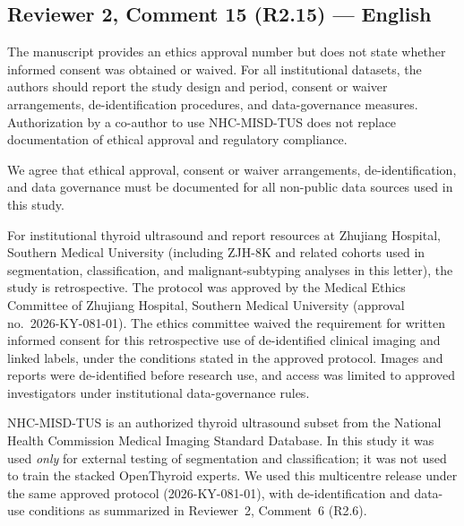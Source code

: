 \subsection*{Reviewer 2, Comment 15 (R2.15) --- English}
\begin{reviewercomment}
The manuscript provides an ethics approval number but does not state whether informed consent was obtained or waived. For all institutional datasets, the authors should report the study design and period, consent or waiver arrangements, de-identification procedures, and data-governance measures. Authorization by a co-author to use NHC-MISD-TUS does not replace documentation of ethical approval and regulatory compliance.
\end{reviewercomment}
\begin{authorresponse}
We agree that ethical approval, consent or waiver arrangements, de-identification, and data governance must be documented for all non-public data sources used in this study.\par
For institutional thyroid ultrasound and report resources at Zhujiang Hospital, Southern Medical University (including ZJH-8K and related cohorts used in segmentation, classification, and malignant-subtyping analyses in this letter), the study is retrospective. The protocol was approved by the Medical Ethics Committee of Zhujiang Hospital, Southern Medical University (approval no.\ 2026-KY-081-01). The ethics committee waived the requirement for written informed consent for this retrospective use of de-identified clinical imaging and linked labels, under the conditions stated in the approved protocol. Images and reports were de-identified before research use, and access was limited to approved investigators under institutional data-governance rules.\par
NHC-MISD-TUS is an authorized thyroid ultrasound subset from the National Health Commission Medical Imaging Standard Database. In this study it was used \emph{only} for external testing of segmentation and classification; it was not used to train the stacked OpenThyroid experts. We used this multicentre release under the same approved protocol (2026-KY-081-01), with de-identification and data-use conditions as summarized in Reviewer~2, Comment~6 (R2.6).\par
\end{authorresponse}

\clearpage
